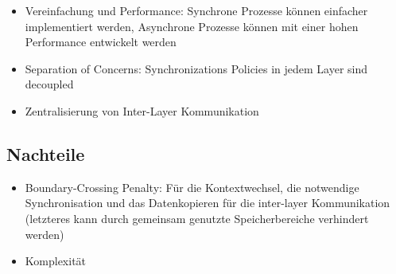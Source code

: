 \begin{itemize}
	\item Vereinfachung und Performance: Synchrone Prozesse können einfacher implementiert werden, Asynchrone Prozesse können mit einer hohen Performance entwickelt werden
	\item Separation of Concerns: Synchronizations Policies in jedem Layer sind decoupled
	\item Zentralisierung von Inter-Layer Kommunikation
\end{itemize}

\subsection{Nachteile}

\begin{itemize}
	\item Boundary-Crossing Penalty: Für die Kontextwechsel, die notwendige Synchronisation und das Datenkopieren für die inter-layer Kommunikation (letzteres kann durch gemeinsam genutzte Speicherbereiche verhindert werden)
	\item Komplexität
\end{itemize}


